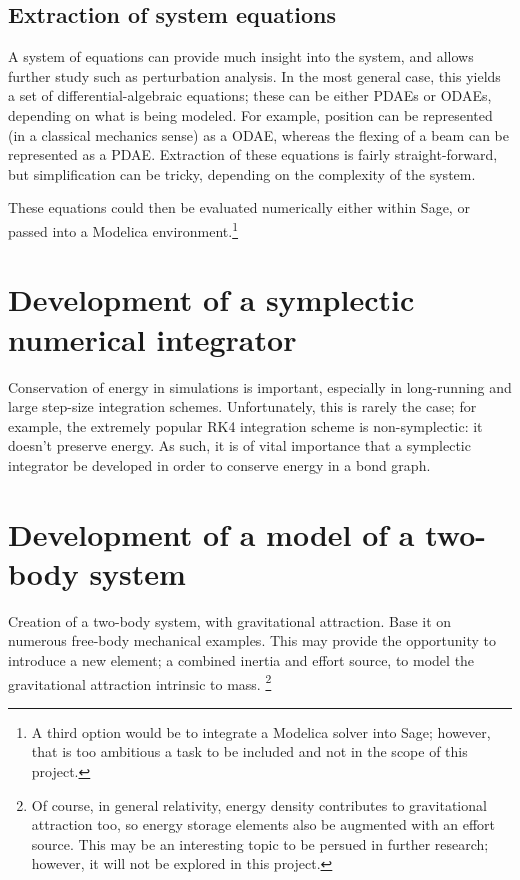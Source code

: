 \documentclass[utf,a4paper,12pt]{report}
\begin{document}
\subsection{Extraction of system equations}
A system of equations can provide much insight into the system, and allows further study such as perturbation analysis. In the most general case, this yields a set of differential-algebraic equations; these can be either PDAEs or ODAEs, depending on what is being modeled. For example, position can be represented (in a classical mechanics sense) as a ODAE, whereas the flexing of a beam can be represented as a PDAE. Extraction of these equations is fairly straight-forward, but simplification can be tricky, depending on the complexity of the system.

These equations could then be evaluated numerically either within Sage, or passed into a Modelica environment.\footnote{A third option would be to integrate a Modelica solver into Sage; however, that is too ambitious a task to be included and not in the scope of this project.}
\section{Development of a symplectic numerical integrator}
Conservation of energy in simulations is important, especially in long-running and large step-size integration schemes. Unfortunately, this is rarely the case; for example, the extremely popular RK4 integration scheme is non-symplectic: it doesn't preserve energy. As such, it is of vital importance that a symplectic integrator be developed in order to conserve energy in a bond graph.
\section{Development of a model of a two-body system}
Creation of a two-body system, with gravitational attraction. Base it on numerous free-body mechanical examples. This may provide the opportunity to introduce a new element; a combined inertia and effort source, to model the gravitational attraction intrinsic to mass. \footnote{Of course, in general relativity, energy density contributes to gravitational attraction too, so energy storage elements also be augmented with an effort source. This may be an interesting topic to be persued in further research; however, it will not be explored in this project.} 
\end{document}
